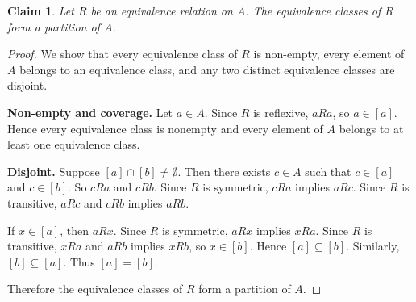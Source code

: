 \documentclass{article}
\newtheorem*{claim}{Claim}
\begin{document}
\begin{claim}
    Let $R$ be an equivalence relation on $A$. The equivalence classes of $R$ form a partition of $A$.
\end{claim}

\begin{proof}
    We show that every equivalence class of $R$ is non-empty, every element of $A$ belongs to an equivalence class,
    and any two distinct equivalence classes are disjoint.

    \medskip

    \textbf{Non-empty and coverage.} Let $a \in A$. Since $R$ is reflexive, $aRa$, so $a \in [a]$. Hence every 
    equivalence class is nonempty and every element of $A$ belongs to at least one equivalence class.

    \medskip

    \textbf{Disjoint.} Suppose $[a] \cap [b] \neq \emptyset$. Then there exists $c \in A$ such that $c \in [a]$
    and $c \in [b]$. So $cRa$ and $cRb$. Since $R$ is symmetric, $cRa$ implies $aRc$. Since $R$ is transitive, 
    $aRc$ and $cRb$ implies $aRb$.

    \medskip
    
    If $x \in [a]$, then $aRx$. Since $R$ is symmetric, $aRx$ implies $xRa$.
    Since $R$ is transitive, $xRa$ and $aRb$ implies $xRb$, so $x \in [b]$. Hence $[a] \subseteq [b]$. Similarly, 
    $[b] \subseteq [a]$. Thus $[a] = [b]$.

    \medskip

    Therefore the equivalence classes of $R$ form a partition of $A$.
\end{proof}
\end{document}
